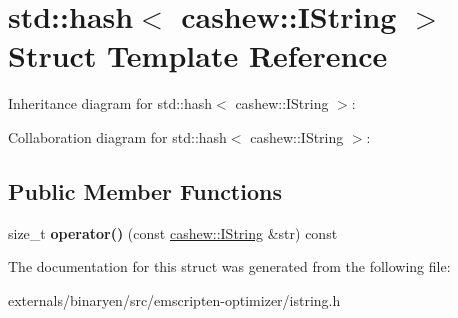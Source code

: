 \hypertarget{structstd_1_1hash_3_01cashew_1_1_i_string_01_4}{}\section{std\+:\+:hash$<$ cashew\+:\+:I\+String $>$ Struct Template Reference}
\label{structstd_1_1hash_3_01cashew_1_1_i_string_01_4}


Inheritance diagram for std\+:\+:hash$<$ cashew\+:\+:I\+String $>$\+:


Collaboration diagram for std\+:\+:hash$<$ cashew\+:\+:I\+String $>$\+:
\subsection*{Public Member Functions}
\begin{DoxyCompactItemize}
\item 
\mbox{\label{structstd_1_1hash_3_01cashew_1_1_i_string_01_4_ae77e150704434b9a5bdc1b70d9162178}} 
size\+\_\+t {\bfseries operator()} (const \mbox{\hyperlink{structcashew_1_1_i_string}{cashew\+::\+I\+String}} \&str) const
\end{DoxyCompactItemize}


The documentation for this struct was generated from the following file\+:\begin{DoxyCompactItemize}
\item 
externals/binaryen/src/emscripten-\/optimizer/istring.\+h\end{DoxyCompactItemize}
